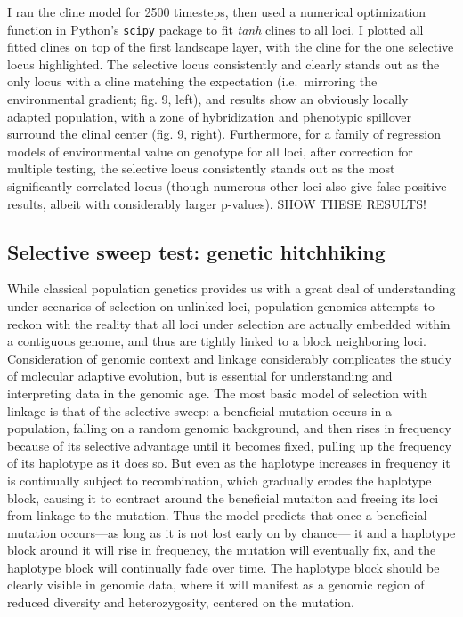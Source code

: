 ﻿\documentclass{article}
\begin{document}
I ran the cline model for 2500 timesteps, then used a numerical optimization
function in Python's \texttt{scipy} package to fit \emph{tanh} clines to all loci.
I plotted all fitted clines on top of the first landscape layer, with the cline
for the one selective locus highlighted.
The selective locus consistently and clearly stands out as the only locus with a cline
matching the expectation (i.e.\ mirroring the environmental gradient; fig. 9, left),
and results show an obviously locally adapted population, with a zone of hybridization
and phenotypic spillover surround the clinal center (fig. 9, right).
Furthermore, for a family of regression models of environmental value on genotype
for all loci, after correction for multiple testing, the selective locus consistently
stands out as the most significantly correlated locus (though numerous other loci
also give false-positive results, albeit with considerably larger p-values). SHOW
THESE RESULTS!

\subsection{Selective sweep test: genetic hitchhiking}
While classical population genetics provides us with a great
deal of understanding under scenarios of selection 
on unlinked loci, population genomics attempts to reckon
with the reality that all loci under selection are actually
embedded within a contiguous genome, and thus are tightly linked
to a block neighboring loci. Consideration of genomic context and linkage
considerably complicates the study of molecular adaptive evolution, but is
essential for understanding and interpreting data in the genomic age. The
most basic model of selection with linkage is that of the selective sweep:
a beneficial mutation occurs in a population, falling on a
random genomic background, and then rises in frequency because of its
selective advantage until it becomes fixed, pulling up the frequency of its
haplotype as it does so. But even as the haplotype increases in frequency it is
continually subject to recombination, which gradually erodes the haplotype block,
causing it to contract around the beneficial mutaiton and freeing its
loci from linkage to the mutation. Thus the model predicts that once a
beneficial mutation occurs---as long as it is not lost early on by chance---
it and a haplotype block around it will rise in frequency, the mutation will
eventually fix, and the haplotype block will continually fade over time.
The haplotype block should be clearly visible in genomic data, where it will
manifest as a genomic region of reduced diversity and heterozygosity, centered
on the mutation.
\end{document}
